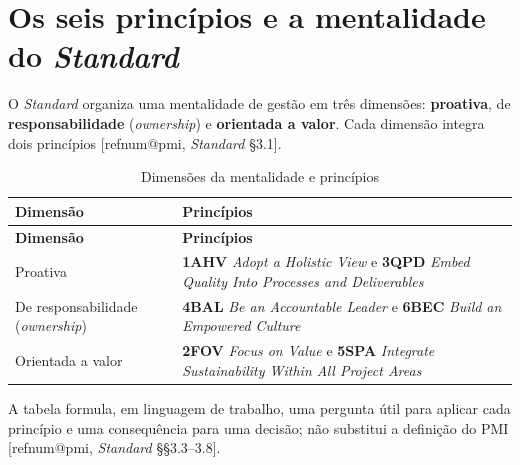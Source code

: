\documentclass[11pt,a4paper]{article}
\makeatletter
\newcommand{\refnum}[1]{\csname refnum@#1\endcsname}
\newcommand{\cit}[1]{[\refnum{#1}]}
\newcommand{\SingleSpacing}{}
\newcommand{\fontetab}[1]{\par\vspace{3pt}{\small\noindent Fonte: #1\par}}
\makeatother
\begin{document}
\section{Os seis princípios e a mentalidade do \textit{Standard}}

O \textit{Standard} organiza uma mentalidade de gestão em três dimensões: \textbf{proativa}, de \textbf{responsabilidade} (\textit{ownership}) e \textbf{orientada a valor}. Cada dimensão integra dois princípios [\refnum{pmi}, \textit{Standard} §3.1].

\begingroup\SingleSpacing\small
\begin{longtable}{@{}>{\raggedright\arraybackslash}p{}>{\raggedright\arraybackslash}p{}@{}}
\caption{Dimensões da mentalidade e princípios}\label{tab:t2}\\
\toprule
\textbf{Dimensão} & \textbf{Princípios}\\
\midrule
\endfirsthead
\toprule
\textbf{Dimensão} & \textbf{Princípios}\\
\midrule
\endhead
\bottomrule
\endfoot
\bottomrule
\endlastfoot
Proativa & \textbf{1AHV} \textit{Adopt a Holistic View} e \textbf{3QPD} \textit{Embed Quality Into Processes and Deliverables}\\[3pt]
De responsabilidade (\textit{ownership}) & \textbf{4BAL} \textit{Be an Accountable Leader} e \textbf{6BEC} \textit{Build an Empowered Culture}\\[3pt]
Orientada a valor & \textbf{2FOV} \textit{Focus on Value} e \textbf{5SPA} \textit{Integrate Sustainability Within All Project Areas}\\[3pt]
\end{longtable}
\endgroup
\fontetab{Elaborado pelos autores (2026), com base em \cit{pmi}.}

A tabela formula, em linguagem de trabalho, uma pergunta útil para aplicar cada princípio e uma consequência para uma decisão; não substitui a definição do PMI [\refnum{pmi}, \textit{Standard} §§3.3–3.8].
\end{document}
